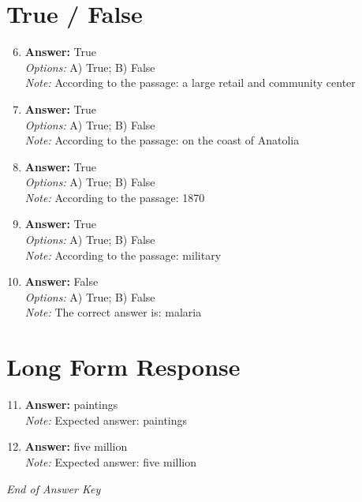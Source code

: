 \documentclass[12pt]{article}
\begin{document}
\section*{True / False}
\begin{enumerate}[label=\arabic*.]
\setcounter{enumi}{5}
\item \textbf{Answer:} True
\\ \textit{Options:} A) True; B) False
\\ \textit{Note:} According to the passage: a large retail and community center
\item \textbf{Answer:} True
\\ \textit{Options:} A) True; B) False
\\ \textit{Note:} According to the passage: on the coast of Anatolia
\item \textbf{Answer:} True
\\ \textit{Options:} A) True; B) False
\\ \textit{Note:} According to the passage: 1870
\item \textbf{Answer:} True
\\ \textit{Options:} A) True; B) False
\\ \textit{Note:} According to the passage: military
\item \textbf{Answer:} False
\\ \textit{Options:} A) True; B) False
\\ \textit{Note:} The correct answer is: malaria
\end{enumerate}

\section*{Long Form Response}
\begin{enumerate}[label=\arabic*.]
\setcounter{enumi}{10}
\item \textbf{Answer:} paintings
\\ \textit{Note:} Expected answer: paintings
\item \textbf{Answer:} five million
\\ \textit{Note:} Expected answer: five million
\end{enumerate}

\vfill
\noindent\textit{End of Answer Key}
\end{document}
